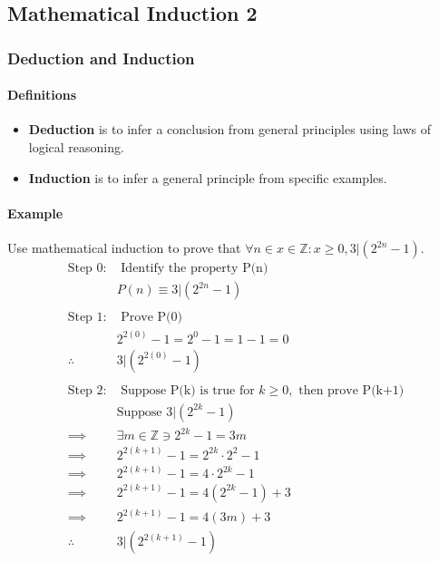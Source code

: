 \subsection{Mathematical Induction 2}
\hrulefill
\subsubsection*{Deduction and Induction}
\paragraph*{Definitions}
\begin{itemize}
    \item \textbf{Deduction} is to infer a conclusion from general principles using laws of logical reasoning.
    \item \textbf{Induction} is to infer a general principle from specific examples.
\end{itemize}

\paragraph*{Example}
Use mathematical induction to prove that $\forall n \in {x \in \mathbb{Z} : x \geq 0}, 3 | (2^{2n}-1)$.
\begin{align*}
    \text{Step 0:}& \text{ Identify the property P(n)}\\
    &P(n) \equiv 3 | (2^{2n}-1)\\
    \\
    \text{Step 1:}& \text{ Prove P(0)}\\
    & 2^{2(0)} - 1 = 2^0 - 1 = 1 - 1 = 0\\
    \therefore \quad & 3 | (2^{2(0)} - 1)\\
    \\
    \text{Step 2:}& \text{ Suppose P(k) is true for } k \geq 0, \text{ then prove P(k+1)}\\
    &\text{Suppose } 3 | (2^{2k} - 1)\\
    \implies& \exists m \in \mathbb{Z} \ni 2^{2k} - 1 = 3m\\
    \implies& 2^{2(k+1)}-1 = 2^{2k} \cdot 2^{2} - 1\\
    \implies& 2^{2(k+1)}-1 = 4 \cdot 2^{2k} - 1\\
    \implies& 2^{2(k+1)}-1 = 4(2^{2k} - 1) + 3\\
    \implies& 2^{2(k+1)}-1 = 4(3m) + 3\\
    \therefore \quad & 3 | (2^{2(k+1)} - 1)\\
\end{align*}

